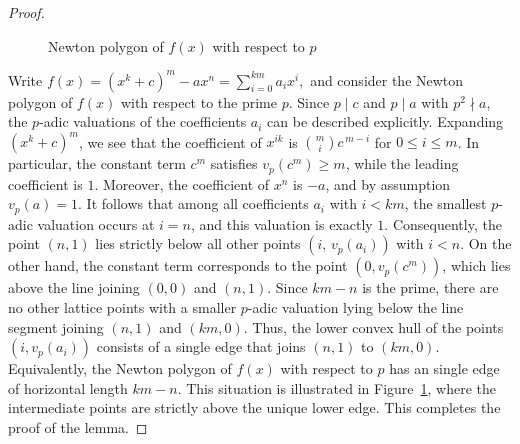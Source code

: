 \documentclass[table]{amsart}
\numberwithin{equation}{section}
\begin{document}
\begin{proof}
\begin{figure}[htb!]
\begin{tikzpicture}[scale=1]
\end{tikzpicture}
\caption{Newton polygon of $f(x)$ with respect to $p$}
\label{fig:newton-polygon}
\end{figure}
Write $f(x)=(x^{k}+c)^{m}-a x^{n}=\sum_{i=0}^{km} a_i x^i,$
and consider the Newton polygon of $f(x)$ with respect to the prime $p$. Since $p\mid c$ and $p\mid a$ with $p^{2}\nmid a$, the $p$-adic valuations of the coefficients $a_i$ can be described explicitly. Expanding $(x^{k}+c)^m$, we see that the coefficient of $x^{ik}$ is $\binom{m}{i}c^{\,m-i}$ for $0\le i\le m$. In particular, the constant term $c^{m}$ satisfies $v_p(c^{m})\ge m$, while the leading coefficient is $1$.
Moreover, the coefficient of $x^{n}$ is $-a$, and by assumption $v_p(a)=1$. It follows that among all coefficients $a_i$ with $i<km$, the smallest
$p$-adic valuation occurs at $i=n$, and this valuation is exactly $1$. Consequently, the point $(n,1)$ lies strictly below all other points $(i,\,v_p(a_i))$ with $i<n$. On the other hand, the constant term corresponds to the point $(0,v_p(c^{m}))$, which lies above the line joining $(0,0)$ and $(n,1)$. Since $km-n$ is the prime, there are no other lattice points with a smaller $p$-adic valuation lying below the line segment joining $(n,1)$ and $(km,0)$. Thus, the lower convex hull of the points $(i,v_p(a_i))$ consists of a single
edge that joins $(n,1)$ to $(km,0)$. Equivalently, the Newton polygon of $f(x)$ with respect to $p$ has an single edge of horizontal length $km-n$. This situation is illustrated in Figure~\ref{fig:newton-polygon}, where the intermediate points are strictly above the unique lower edge. This completes the proof of the lemma.
\end{proof}
\end{document}
